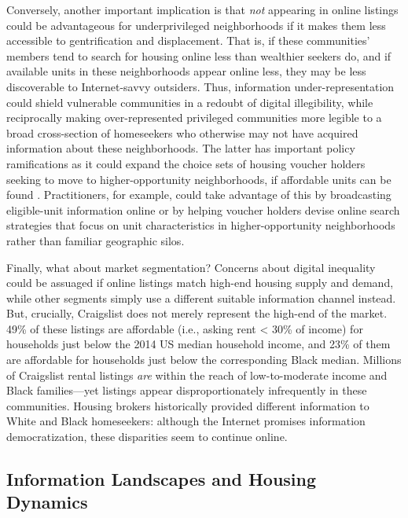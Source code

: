 \documentclass[11pt,letterpaper]{article}
\begin{document}
Conversely, another important implication is that \emph{not} appearing in online listings could be advantageous for underprivileged neighborhoods if it makes them less accessible to gentrification and displacement. That is, if these communities' members tend to search for housing online less than wealthier seekers do, and if available units in these neighborhoods appear online less, they may be less discoverable to Internet-savvy outsiders. Thus, information under-representation could shield vulnerable communities in a redoubt of digital illegibility, while reciprocally making over-represented privileged communities more legible to a broad cross-section of homeseekers who otherwise may not have acquired information about these neighborhoods. The latter has important policy ramifications as it could expand the choice sets of housing voucher holders seeking to move to higher-opportunity neighborhoods, if affordable units can be found \cite[cf.][]{rosen_rigging_2014,schwartz_encouraging_2017,mclaughlin_data_2018,reina_section_2019}. Practitioners, for example, could take advantage of this by broadcasting eligible-unit information online or by helping voucher holders devise online search strategies that focus on unit characteristics in higher-opportunity neighborhoods rather than familiar geographic silos.

Finally, what about market segmentation? Concerns about digital inequality could be assuaged if online listings match high-end housing supply and demand, while other segments simply use a different suitable information channel instead. But, crucially, Craigslist does not merely represent the high-end of the market. 49\% of these listings are affordable (i.e., asking rent < 30\% of income) for households just below the 2014 US median household income, and 23\% of them are affordable for households just below the corresponding Black median. Millions of Craigslist rental listings \emph{are} within the reach of low-to-moderate income and Black families---yet listings appear disproportionately infrequently in these communities. Housing brokers historically provided different information to White and Black homeseekers: although the Internet promises information democratization, these disparities seem to continue online.

\subsection{Information Landscapes and Housing Dynamics}
\end{document}
